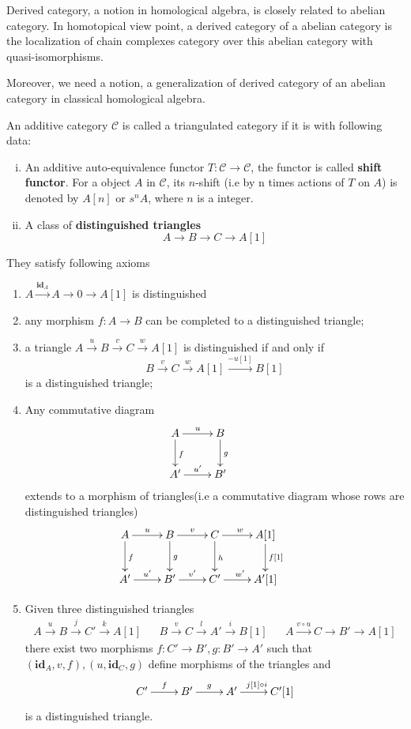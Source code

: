 Derived category, a notion in homological algebra, is closely related to abelian category. In homotopical view point, a derived category of a abelian category is the localization of chain complexes category over this abelian category with quasi-isomorphisms.
\par
Moreover, we need a notion, a generalization of derived category of an abelian category in classical homological algebra.
\begin{mydefn}
An additive category $\mathcal{C}$ is called a triangulated category if it is with following data:
\begin{enumerate}[(i)]
    \item An additive auto-equivalence functor $T : \mathcal{C}\rightarrow \mathcal{C}$, the functor is called \textbf{shift functor}. For a object $A$ in $\mathcal{C}$, its $n$-shift (i.e by n times actions of $T$ on $A$) is denoted by $A[n]$ or $s^{n}A$, where $n$ is a integer. 
    \item A class of \textbf{distinguished triangles}
    \[
    A \rightarrow B \rightarrow C \rightarrow A[1]
    \]
\end{enumerate}
They satisfy following axioms
\begin{enumerate}[TR1]
    \item $A \xrightarrow{\textbf{id}_{A}} A \rightarrow 0 \rightarrow A[1]$ is distinguished
    \item any morphism $f: A \rightarrow B$ can be completed to a distinguished triangle;
    \item a triangle $A \xrightarrow{u} B \xrightarrow{v} C \xrightarrow{w} A[1]$ is distinguished if and only if 
    \[
    B \xrightarrow{v} C \xrightarrow{w} A[1] \xrightarrow{-u[1]} B[1]
    \]
    is a distinguished triangle;
    \item Any commutative diagram
    \[
    \xymatrix{
    A \ar[r]^{u} \ar[d]^{f} &B \ar[d]^{g} &\\
    A' \ar[r]^{u'}& B' &
    }\]
    extends to a morphism of triangles(i.e a commutative diagram whose rows are distinguished triangles)
    \[
    \xymatrix{
    A \ar[r]^{u} \ar[d]^{f} & B \ar[r]^{v} \ar[d]^{g} & C \ar[r]^{w} \ar[d]^{h} & A[1] \ar[d]^{f[1]}&\\
    A' \ar[r]^{u'}& B' \ar[r]^{v'} & C' \ar[r]^{w'} & A'[1]
    }\]
    \item Given three distinguished triangles
    \begin{align*}
        A \xrightarrow{u} B \xrightarrow{j} C' \xrightarrow{k} A[1]& &B \xrightarrow{v} C \xrightarrow{l} A' \xrightarrow{i} B[1]& &A \xrightarrow{v \circ u} C \rightarrow B' \rightarrow A[1]
    \end{align*}
    there exist two morphisms $f: C' \rightarrow B', g: B' \rightarrow A'$ such that$(\textbf{id}_{A},v,f),(u,\textbf{id}_{C},g)$ define morphisms of the triangles and \[
    \xymatrix{C' \ar[r]^{f} &B' \ar[r]^{g} & A' \ar[r]^{j[1] \circ i}& C'[1]}
    \]
    is a distinguished triangle.
\end{enumerate}
\end{mydefn}
